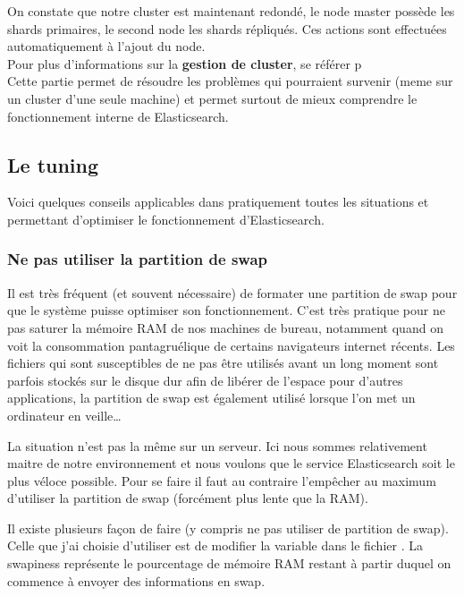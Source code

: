 {On constate que notre cluster est maintenant redondé, le node master possède les 
shards primaires, le second node les shards répliqués. Ces actions sont effectuées
automatiquement à l'ajout du node.\\[2mm]

Pour plus d'informations sur la \textbf{gestion de cluster}, se référer p\pageref{subsec:elasticcluster}\\[2mm]


Cette partie permet de résoudre les problèmes qui pourraient survenir (meme sur
un cluster d'une seule machine) et permet surtout de mieux comprendre le fonctionnement
interne de Elasticsearch.

\subsection{Le tuning}
\label{subsec:elastictuning}
Voici quelques conseils applicables dans pratiquement toutes les situations et 
permettant d'optimiser le fonctionnement d'Elasticsearch.

\subsubsection{Ne pas utiliser la partition de swap}
Il est très fréquent (et souvent nécessaire) de formater une partition de swap pour
que le système puisse optimiser son fonctionnement. C'est très pratique pour ne pas
saturer la mémoire RAM de nos machines de bureau, notamment quand on voit la consommation
pantagruélique de certains navigateurs internet récents. Les fichiers qui sont 
susceptibles de ne pas être utilisés avant un long moment sont parfois stockés sur le
disque dur afin de libérer de l'espace pour d'autres applications, la partition de swap est
également utilisé lorsque l'on met un ordinateur en veille\ldots

La situation n'est pas la même sur un serveur. Ici nous sommes relativement maitre
de notre environnement et nous voulons que le service Elasticsearch soit 
le plus véloce possible. Pour se faire il faut au contraire l'empêcher au maximum 
d'utiliser la partition de swap (forcément plus lente que la RAM).

Il existe plusieurs façon de faire (y compris ne pas utiliser de partition de swap).
Celle que j'ai choisie d'utiliser est de modifier la variable 
dans le fichier . La swapiness représente le pourcentage
de mémoire RAM restant à partir duquel on commence à envoyer des informations en
swap.

}
